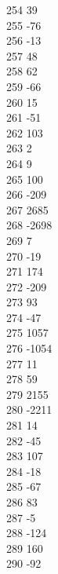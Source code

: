 { 254	39 \\
 255	-76 \\
 256	-13 \\
 257	48 \\
 258	62 \\
 259	-66 \\
 260	15 \\
 261	-51 \\
 262	103 \\
 263	2 \\
 264	9 \\
 265	100 \\
 266	-209 \\
 267	2685 \\
 268	-2698 \\
 269	7 \\
 270	-19 \\
 271	174 \\
 272	-209 \\
 273	93 \\
 274	-47 \\
 275	1057 \\
 276	-1054 \\
 277	11 \\
 278	59 \\
 279	2155 \\
 280	-2211 \\
 281	14 \\
 282	-45 \\
 283	107 \\
 284	-18 \\
 285	-67 \\
 286	83 \\
 287	-5 \\
 288	-124 \\
 289	160 \\
 290	-92 \\
}
